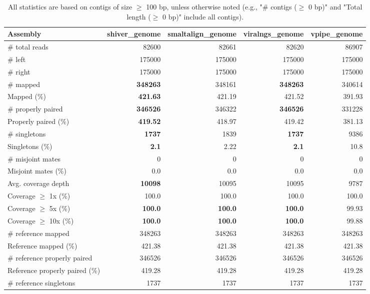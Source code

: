 \documentclass[12pt,a4paper]{article}
\begin{document}
\begin{table}[ht]
\begin{center}
\caption{All statistics are based on contigs of size $\geq$ 100 bp, unless otherwise noted (e.g., "\# contigs ($\geq$ 0 bp)" and "Total length ($\geq$ 0 bp)" include all contigs).}
\begin{tabular}{|l*{4}{|r}|}
\hline
Assembly & shiver\_genome & smaltalign\_genome & viralngs\_genome & vpipe\_genome \\ \hline
\# total reads & 82600 & 82661 & 82620 & 86907 \\ \hline
\# left & 175000 & 175000 & 175000 & 175000 \\ \hline
\# right & 175000 & 175000 & 175000 & 175000 \\ \hline
\# mapped & {\bf 348263} & 348161 & {\bf 348263} & 340614 \\ \hline
Mapped (\%) & {\bf 421.63} & 421.19 & 421.52 & 391.93 \\ \hline
\# properly paired & {\bf 346526} & 346322 & {\bf 346526} & 331228 \\ \hline
Properly paired (\%) & {\bf 419.52} & 418.97 & 419.42 & 381.13 \\ \hline
\# singletons & {\bf 1737} & 1839 & {\bf 1737} & 9386 \\ \hline
Singletons (\%) & {\bf 2.1} & 2.22 & {\bf 2.1} & 10.8 \\ \hline
\# misjoint mates & 0 & 0 & 0 & 0 \\ \hline
Misjoint mates (\%) & 0.0 & 0.0 & 0.0 & 0.0 \\ \hline
Avg. coverage depth & {\bf 10098} & 10095 & 10095 & 9787 \\ \hline
Coverage $\geq$ 1x (\%) & 100.0 & 100.0 & 100.0 & 100.0 \\ \hline
Coverage $\geq$ 5x (\%) & {\bf 100.0} & {\bf 100.0} & {\bf 100.0} & 99.93 \\ \hline
Coverage $\geq$ 10x (\%) & {\bf 100.0} & {\bf 100.0} & {\bf 100.0} & 99.88 \\ \hline
\# reference mapped & 348263 & 348263 & 348263 & 348263 \\ \hline
Reference mapped (\%) & 421.38 & 421.38 & 421.38 & 421.38 \\ \hline
\# reference properly paired & 346526 & 346526 & 346526 & 346526 \\ \hline
Reference properly paired (\%) & 419.28 & 419.28 & 419.28 & 419.28 \\ \hline
\# reference singletons & 1737 & 1737 & 1737 & 1737 \\ \hline

\end{tabular}
\end{center}
\end{table}
\end{document}

